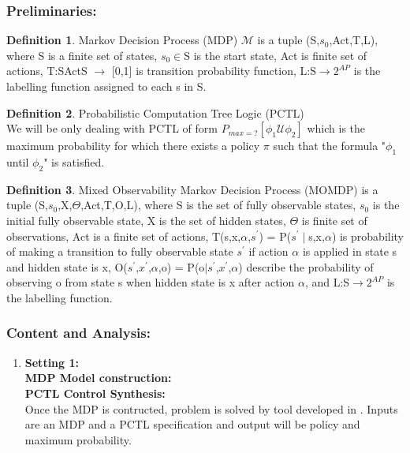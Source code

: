 \documentclass{article}
\theoremstyle{definition}
\newtheorem{definition}{Definition}[section]
\begin{document}
\subsubsection{Preliminaries:}
\theoremstyle{definition}
\begin{definition}{Markov Decision Process (MDP)} $\mathcal{M}$ is a tuple (S,$s_0$,Act,T,L), where S is a finite set of states, $s_0 \in$S is the start state, Act is finite set of actions, T:S\times Act\times S $\rightarrow$ [0,1] is transition probability function, L:S$\rightarrow 2^{AP}$ is the labelling function assigned to each s in S.
\end{definition}
\begin{definition}{Probabilistic Computation Tree Logic (PCTL)}\\
We will be only dealing with PCTL of form $P_{max=?}[\phi_1 \mathcal{U} \phi_2]$ which is the maximum probability for which there exists a policy $\pi$ such that the formula "$\phi_1$ until $\phi_2$" is satisfied.
\end{definition}
\begin{definition}{Mixed Observability Markov Decision Process (MOMDP)} \cite{sahil1}
is a tuple (S,$s_0$,X,$\Theta$,Act,T,O,L), where S is the set of fully observable states, $s_0$ is the initial fully observable state, X is the set of hidden states, $\Theta$ is finite set of observations, Act is a finite set of actions, T(s,x,$\alpha$,$s^'$) = P($s^{'}\mid$s,x,$\alpha$) is probability of making a transition to fully observable state $s^'$ if action $\alpha$ is applied in state s and hidden state is x, O($s^'$,$x^'$,$\alpha$,o) = P(o$\mid s^{'}$,$x^'$,$\alpha$) describe the probability of observing o from state s when hidden state is x after action $\alpha$, and L:S$\rightarrow 2^{AP}$ is the labelling function.
\end{definition}

\subsubsection{Content and Analysis:}
\begin{enumerate}
    \item \textbf{Setting 1:}\\
    \textbf{MDP Model construction:} \\
    
    \textbf{PCTL Control Synthesis:}\\
    Once the MDP is contructed, problem is solved by tool developed in \cite{jatin1}. Inputs are an MDP and a PCTL specification and output will be policy and maximum probability.
\end{enumerate}
\end{document}
